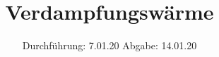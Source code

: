 

\subject{V203}
\title{Verdampfungswärme}
\date{%
  Durchführung: 7.01.20
  \hspace{3em}
  Abgabe: 14.01.20
}



\maketitle
\thispagestyle{empty}
\tableofcontents
\newpage







\printbibliography{}


